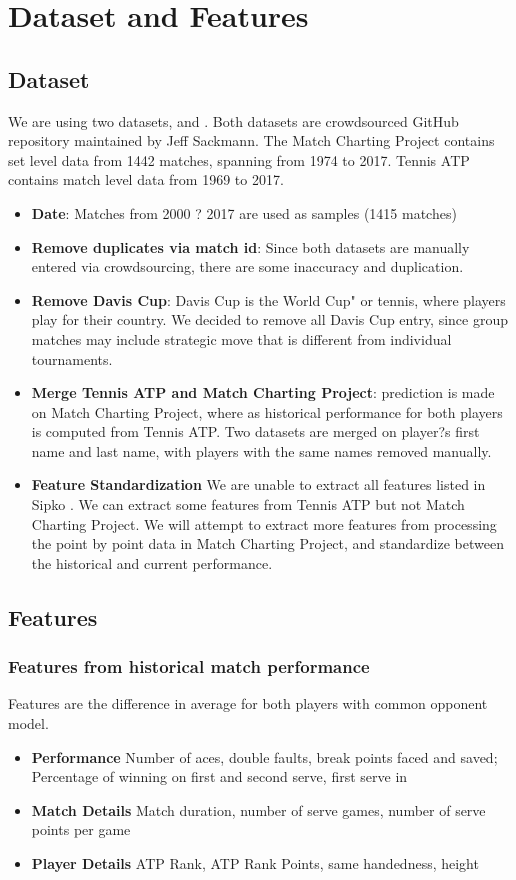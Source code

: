 \documentclass[paper=a4, fontsize=11pt]{scrartcl} %
\numberwithin{equation}{section} %
\numberwithin{figure}{section} %
\numberwithin{table}{section} %
\begin{document}
\section{Dataset and Features}
\subsection{Dataset}
We are using two datasets, \cite{tennis_atp} and \cite{tennis_charting}.  Both datasets are crowdsourced GitHub repository maintained by Jeff Sackmann.  The Match Charting Project contains set level data from 1442 matches, spanning from 1974 to 2017.  Tennis ATP contains match level data from 1969 to 2017.
\begin{itemize}
\item \textbf{Date}: Matches from 2000 ? 2017 are used as samples (1415 matches)
\item \textbf{Remove duplicates via match id}: Since both datasets are manually entered
via crowdsourcing, there are some inaccuracy and duplication.
\item \textbf{Remove Davis Cup}: Davis Cup is the World Cup" or tennis, where players play for their country.  We decided to remove all Davis Cup entry, since group matches may include strategic move that is different from individual tournaments.
\item \textbf{Merge Tennis ATP and Match Charting Project}: prediction is made on
Match Charting Project, where as historical performance for both players is computed from Tennis ATP. Two datasets are merged on player?s first name and last name, with players with the same names removed manually.
\item \textbf{Feature Standardization} We are unable to extract all features listed in Sipko \cite{tennis1}.  We can extract some features from Tennis ATP but not Match Charting Project.  We will attempt to extract more features from processing the point by point data in Match Charting Project, and standardize between the historical and current performance.
\end{itemize}
\subsection{Features}
\label{sec:feat}
\subsubsection{Features from historical match performance}
Features are the difference in average for both players with common opponent model.
\begin{itemize}
\item \textbf{Performance} Number of aces, double faults, break points faced and saved; Percentage of winning on first and second serve, first serve in
\item \textbf{Match Details} Match duration, number of serve games, number of serve points per game
\item \textbf{Player Details} ATP Rank, ATP Rank Points, same handedness, height
\end{itemize}
\end{document}
